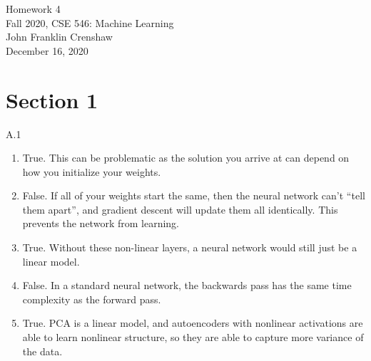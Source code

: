 \documentclass{article}
\renewcommand{\title}{Homework 4}
\renewcommand{\date}{December 16, 2020}
\begin{document}
\begin{center}
        \LARGE \title \\ \vspace{10pt}
        \normalsize 
        Fall 2020, CSE 546: Machine Learning \\ \vspace{2pt}
        John Franklin Crenshaw \\ \vspace{2pt}
        \date
\end{center}


\section*{Section 1}

A.1

\begin{enumerate}
    \item True. This can be problematic as the solution you arrive at can depend on how you initialize your weights.
    \item False. If all of your weights start the same, then the neural network can't ``tell them apart'', and gradient descent will update them all identically.
    This prevents the network from learning.
    \item True. Without these non-linear layers, a neural network would still just be a linear model.
    \item False. In a standard neural network, the backwards pass has the same time complexity as the forward pass.
    \item True. PCA is a linear model, and autoencoders with nonlinear activations are able to learn nonlinear structure, so they are able to capture more variance of the data.
\end{enumerate}

\newpage
\end{document}
